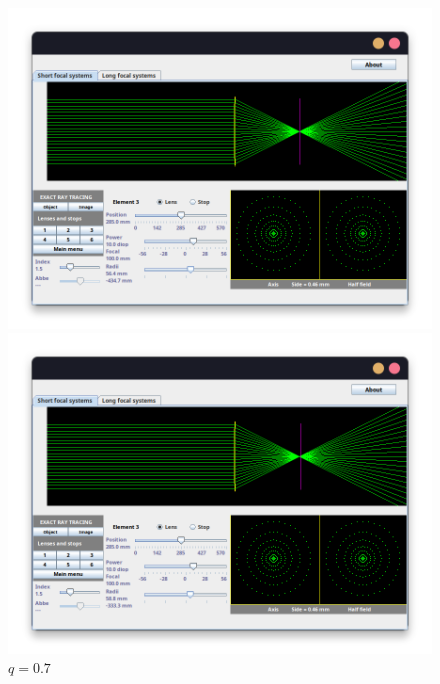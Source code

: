 \documentclass[11pt]{article}
\begin{document}
            \begin{figure}[ht]
                \centering
                \begin{subcaptionblock}{.333\textwidth}
                    \centering
                    \includegraphics[width=\textwidth]{fotos/parte 1/Aberraciones/Aberración Esférica/abbEsf56.png}
                    \caption{$q=0.77$}
                \end{subcaptionblock}%
                \begin{subcaptionblock}{.333\textwidth}
                    \centering
                    \includegraphics[width=\textwidth]{fotos/parte 1/Aberraciones/Aberración Esférica/abbEsf58.png}
                    \caption{$q=0.7$}

\end{subcaptionblock}
\end{figure}
\end{document}
